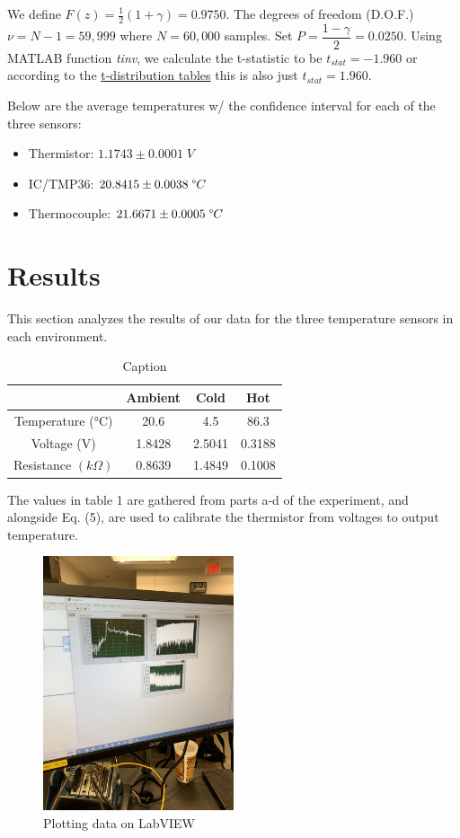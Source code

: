 \documentclass{article}
\begin{document}
We define $F(z) = \frac{1}{2}(1+\gamma) = 0.9750$. The degrees of freedom (D.O.F.) $\nu = N - 1 = 59,999$ where $N=60,000$ samples. Set $P=\dfrac{1-\gamma}{2}=0.0250$. Using MATLAB function \textit{tinv}, we calculate the t-statistic to be $t_{stat} = -1.960$ or according to the \hyperlink{1}{t-distribution tables} this is also just $t_{stat}=1.960$.

Below are the average temperatures w/ the confidence interval for each of the three sensors:
\begin{itemize}
    \item Thermistor: \(1.1743 \pm 0.0001\; V \)
    \item IC/TMP36: \(20.8415 \pm 0.0038\; \degree C\)
    \item Thermocouple: \(21.6671 \pm 0.0005\; \degree C\)
\end{itemize}


\section{Results}
This section analyzes the results of our data for the three temperature sensors in each environment.

\begin{table}
    \centering
    \begin{tabular}{|c|c|c|c|}
        \hline
         &  Ambient & Cold & Hot \\
         \hline
         Temperature (°C) & 20.6 & 4.5 & 86.3 \\
         \hline
         Voltage (V) & 1.8428 & 2.5041 & 0.3188 \\
         \hline
         Resistance \((k\Omega)\) & 0.8639 & 1.4849 & 0.1008 \\
         \hline
    \end{tabular}
    \caption{Caption}
    \label{tab:Initial_Values}
\end{table}

The values in table 1 are gathered from parts a-d of the experiment, and alongside Eq. (5), are used to calibrate the thermistor from voltages to output temperature.  

\begin{figure}[H]
    \centering
    \includegraphics[width=0.5\textwidth, angle = -90]{lab2images/labview_plots.jpg}
    \caption{Plotting data on LabVIEW}
    \end{figure}
    
\end{document}

